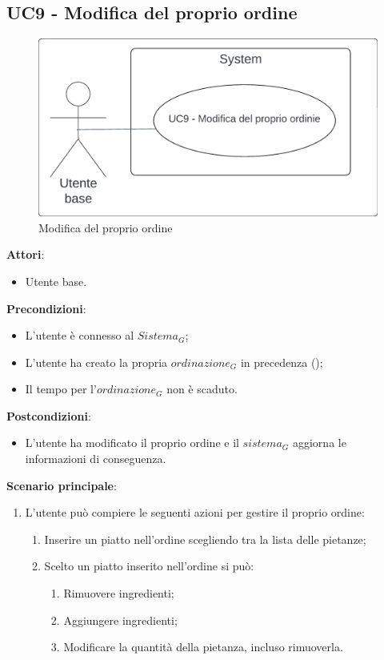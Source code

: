 \subsection{UC9 - Modifica del proprio ordine}\label{usecase:9}
\begin{figure}[H]
    \centering
    \includegraphics[width=0.7\linewidth]{ucd/ucd9.png}
\caption{Modifica del proprio ordine}
\end{figure}
\textbf{Attori}:
\begin{itemize}
    \item Utente base.
\end{itemize}
\textbf{Precondizioni}:
\begin{itemize}
    \item L'utente è connesso al $\textit{Sistema}_G$;
    \item L'utente ha creato la propria $\textit{ordinazione}_G$ in precedenza ();
    \item Il tempo per l'$\textit{ordinazione}_G$ non è scaduto.
\end{itemize}
\textbf{Postcondizioni}:
\begin{itemize}
    \item L'utente ha modificato il proprio ordine e il $\textit{sistema}_G$ aggiorna le informazioni di conseguenza.
\end{itemize}
\textbf{Scenario principale}:
\begin{enumerate}
    \item L'utente può compiere le seguenti azioni per gestire il proprio ordine:
    \begin{enumerate}
        \item Inserire un piatto nell'ordine scegliendo tra la lista delle pietanze;
        \item Scelto un piatto inserito nell'ordine si può:
        \begin{enumerate}
            \item Rimuovere ingredienti;
            \item Aggiungere ingredienti;
            \item Modificare la quantità della pietanza, incluso rimuoverla.
        \end{enumerate}
    \end{enumerate}
\end{enumerate}

\newpage